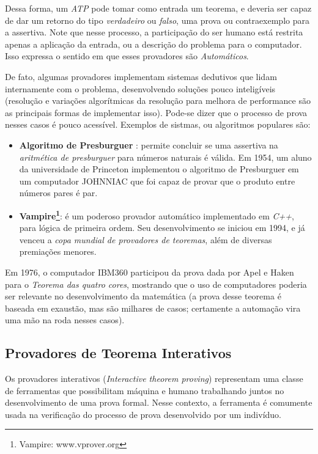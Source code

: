 Dessa forma, um \textit{ATP} pode tomar como entrada um teorema, e deveria ser capaz de dar um retorno do tipo \textit{verdadeiro} ou \textit{falso}, uma prova ou contraexemplo para a assertiva.
Note que nesse processo, a participação do ser humano está restrita apenas a aplicação da entrada, ou a descrição do problema para o computador.
Isso expressa o sentido em que esses provadores são \textit{Automáticos}.

De fato, algumas provadores implementam sistemas dedutivos que lidam internamente com o problema, desenvolvendo soluções pouco inteligíveis (resolução e variações algorítmicas da resolução para melhora de performance são as principais formas de implementar isso).
Pode-se dizer que o processo de prova nesses casos é pouco acessível. Exemplos de sistmas, ou algoritmos populares são:

\begin{itemize}
    \item \textbf{Algoritmo de Presburguer} : permite concluir se uma assertiva na \textit{aritmética de presburguer} para números naturais é válida. Em 1954, um aluno da universidade de Princeton implementou o algoritmo de Presburguer em um computador JOHNNIAC que foi capaz de provar que o produto entre números pares é par.
    \item \textbf{Vampire\footnote{Vampire: www.vprover.org}}: é um poderoso provador automático implementado em \textit{C++}, para lógica de primeira ordem. Seu desenvolvimento se iniciou em 1994, e já venceu a \textit{copa mundial de provadores de teoremas}, além de diversas premiações menores.
\end{itemize}

Em 1976, o computador IBM360 participou da prova dada por Apel e Haken para o \textit{Teorema das quatro cores}, mostrando que o uso de computadores poderia ser relevante no desenvolvimento da matemática (a prova desse teorema é baseada em exaustão, mas são milhares de casos; certamente a automação vira uma mão na roda nesses casos).

\subsection{Provadores de Teorema Interativos}

Os provadores interativos (\textit{Interactive theorem proving}) representam uma classe de ferramentas que possibilitam máquina e humano trabalhando juntos no desenvolvimento de uma prova formal.
Nesse contexto, a ferramenta é comumente usada na verificação do processo de prova desenvolvido por um indivíduo.

